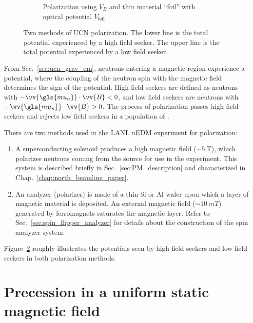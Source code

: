 \begin{figure}
\begin{subfigure}{.5\textwidth}
  \caption{Polarization using $V_B$ and thin \newline material ``foil'' with optical potential $V_\text{foil}$}\label{subfig:polarization_foil}
\end{subfigure}
\caption
{Two methods of UCN polarization.  The lower line is the total potential experienced by a high field seeker.  The upper line is the total potential experienced by a low field seeker.}
\label{fig:polarization_methods}
\end{figure}

From Sec.~\ref{sec:ucn_grav_em}, neutrons entering a magnetic region experience a potential, where the coupling of the neutron spin with the magnetic field determines the sign of the potential. High field seekers are defined as neutrons with $-\vv{\gls{mu_n}}\cdot\vv{B}<0$, and low field seekers are neutrons with $-\vv{\gls{mu_n}}\cdot\vv{B}>0$. The process of polarization passes high field seekers and rejects low field seekers in a population of \ucn.

There are two methods used in the LANL nEDM experiment for \ucn polarization: 
%
\begin{enumerate}
    \item A superconducting solenoid produces a high magnetic field ($\sim \qty{5}{\tesla}$), which polarizes neutrons coming from the \ucn source for use in the experiment. This system is described briefly in Sec.~\ref{sec:PM_description} and characterized in Chap.~\ref{chap:north_beamline_paper}.
    \item An analyzer (polarizer) is made of a thin Si or Al wafer upon which a layer of magnetic material is deposited. An external magnetic field ($\sim \qty{10}{mT}$) generated by ferromagnets saturates the magnetic layer. Refer to Sec.~\ref{sec:spin_flipper_analyzer} for details about the construction of the spin analyzer system.
\end{enumerate}
%
Figure~\ref{fig:polarization_methods} roughly illustrates the potentials seen by high field seekers and low field seekers in both polarization methods.



\section{Precession in a uniform static magnetic field\label{sec:larmor}}


